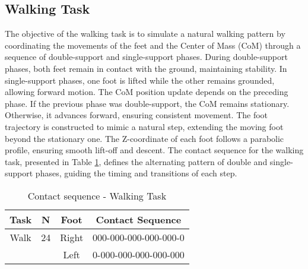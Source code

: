 \documentclass[main.tex]{subfiles}
\begin{document}
\begin{sloppypar}
\subsection{Walking Task}
The objective of the walking task is to simulate a natural walking pattern by coordinating the movements of the feet and the Center of Mass (CoM) through a sequence of double-support and single-support phases. During double-support phases, both feet remain in contact with the ground, maintaining stability. In single-support phases, one foot is lifted while the other remains grounded, allowing forward motion.
The CoM position update depends on the preceding phase. If the previous phase was double-support, the CoM remains stationary. Otherwise, it advances forward, ensuring consistent movement. The foot trajectory is constructed to mimic a natural step, extending the moving foot beyond the stationary one. The Z-coordinate of each foot follows a parabolic profile, ensuring smooth lift-off and descent.
The contact sequence for the walking task, presented in Table \ref{tab:walkingtask}, defines the alternating pattern of double and single-support phases, guiding the timing and transitions of each step.
\begin{table}[H]
    \centering
    \begin{tabular}{|c|c|c|c|}
        \hline
        Task & N & Foot & Contact Sequence \\
        \hline
        Walk & 24 & Right & 000-000-000-000-000-0 \\
             &    & Left  & 0-000-000-000-000-000 \\
        \hline
    \end{tabular}
    \caption{Contact sequence - Walking Task}
    \label{tab:walkingtask}
\end{table}

\end{sloppypar}
\end{document}
